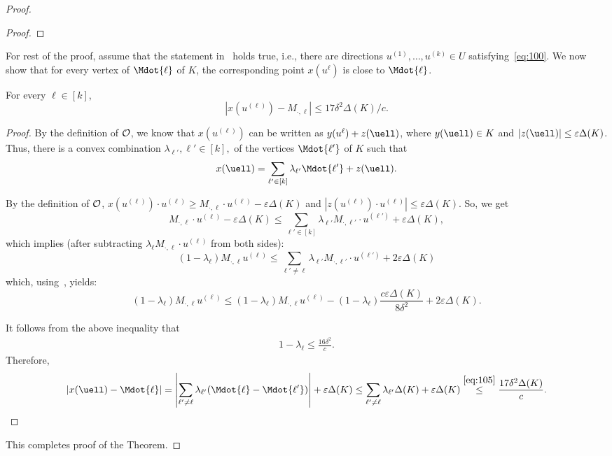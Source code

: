 \begin{proof}
\begin{proof}
\end{proof}

For rest of the proof, assume that the statement in~ holds true, i.e., there are directions $u^{(1)}, \ldots, u^{(k)} \in U$ satisfying~\eqref{eq:100}. 
We now show that for every vertex of $\Mdot{\ell}$ of $K$, the corresponding point $x(u^{\ell})$ is close to  $\Mdot{\ell}$. 
\begin{claim}
    \label{cl:xl}
    For every $\ell \in [k]$, 
    $$|x(u^{(\ell)})-M_{\cdot,\ell}|\leq 17 \delta^2 \Delta(K)/c.$$
\end{claim}
\begin{proof}
    By the definition of $\cal O$, we know that $x(u^{(\ell)})$ can be written as $y(u^{\ell})+z(\uell)$, where $y(\uell) \in K$ and $|z(\uell)| \leq \varepsilon \Delta(K)$. Thus, there is a convex combination $\lambda_{\ell'}, \ell' \in [k],$ of the vertices $\Mdot{\ell'}$ of $K$ such that 
    $$ x(\uell) = \sum_{\ell' \in [k]} \lambda_{\ell'} \Mdot{\ell'} + z(\uell).$$
   

By the definition of $\cal O$, $x(u^{(\ell)})\cdot u^{(\ell)}\geq M_{\cdot, \ell}\cdot u^{(\ell)}-\varepsilon\Delta (K)$ and $|z(u^{(\ell)})\cdot u^{(\ell)}|\leq\varepsilon\Delta(K)$. So, we get
$$M_{\cdot,\ell}\cdot u^{(\ell)}-\varepsilon\Delta(K)\leq \sum_{\ell' \in [k]}\lambda_{\ell'} M_{\cdot,\ell'}\cdot u^{(\ell')}+\varepsilon\Delta(K),$$
which implies (after subtracting $\lambda_\ell M_{\cdot,\ell} \cdot u^{(\ell)}$ from both sides):
$$(1-\lambda_\ell) M_{\cdot,\ell}u^{(\ell)}\leq \sum_{\ell'\not= \ell} \lambda_{\ell'} M_{\cdot,\ell'}\cdot u^{(\ell')}+2\varepsilon\Delta(K)$$
which, using~, yields:
$$(1-\lambda_\ell) M_{\cdot,\ell}u^{(\ell)}\leq (1-\lambda_\ell) M_{\cdot,\ell}u^{(\ell)}-(1-\lambda_\ell)\frac{c\varepsilon\Delta(K)}{8\delta^2}+2\varepsilon\Delta(K).$$


    
It follows from the above inequality that 
\begin{align}
\label{eq:105}
    1- \lambda_\ell \leq \frac{16 \delta^2}{c}.
\end{align}
    Therefore, 
\begin{align}
    |x(\uell) - \Mdot{\ell}| = \left| \sum_{\ell' \neq \ell} \lambda_{\ell'} (\Mdot{\ell} - \Mdot{\ell'})  
    \right| + \varepsilon  \Delta(K) \leq \sum_{\ell' \neq \ell} \lambda_{\ell'} \Delta(K) + \varepsilon \Delta(K) \stackrel{\eqref{eq:105}}{\leq} \frac{17 \delta^2 \Delta(K)}{c}.
    \notag
\end{align}
\end{proof}

This completes proof of the Theorem. 
\end{proof}

